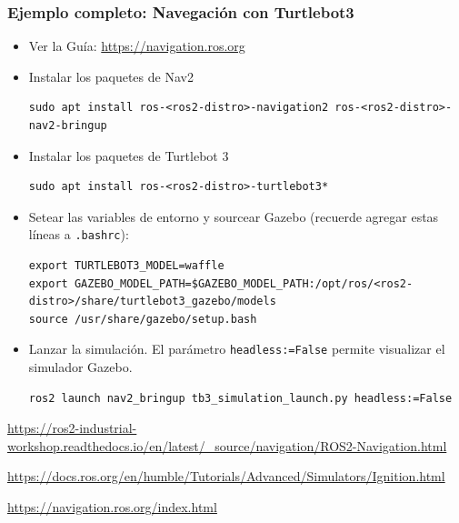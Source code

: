 \begin{frame}[fragile]
	\frametitle{Ejemplo completo: Navegación con Turtlebot3}

    \footnotesize
    \begin{itemize}


        \item Ver la Guía: \url{https://navigation.ros.org}
    
        \item Instalar los paquetes de Nav2 
        
        \begin{lstlisting}[style=bash] 
sudo apt install ros-<ros2-distro>-navigation2 ros-<ros2-distro>-nav2-bringup
        \end{lstlisting}
    
        \item Instalar los paquetes de Turtlebot 3
        
        \begin{lstlisting}[style=bash] 
sudo apt install ros-<ros2-distro>-turtlebot3*
        \end{lstlisting}
    
        \item Setear las variables de entorno y sourcear Gazebo (recuerde agregar estas líneas a \lstinline[style=bash]{.bashrc}):
        
        \begin{lstlisting}[style=bash] 
export TURTLEBOT3_MODEL=waffle
export GAZEBO_MODEL_PATH=$GAZEBO_MODEL_PATH:/opt/ros/<ros2-distro>/share/turtlebot3_gazebo/models
source /usr/share/gazebo/setup.bash
        \end{lstlisting}
    
        \item Lanzar la simulación. El parámetro \lstinline[style=bash]{headless:=False} permite visualizar el simulador Gazebo.
        
        \begin{lstlisting}[style=bash] 
ros2 launch nav2_bringup tb3_simulation_launch.py headless:=False
        \end{lstlisting}
     
    \end{itemize}
    \tiny
    \url{https://ros2-industrial-workshop.readthedocs.io/en/latest/\_source/navigation/ROS2-Navigation.html}
        
    \url{https://docs.ros.org/en/humble/Tutorials/Advanced/Simulators/Ignition.html}
        
    \url{https://navigation.ros.org/index.html}

\end{frame}


